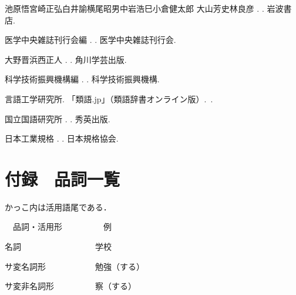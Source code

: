 \documentclass[japanese]{jnlp_1.4}
\begin{document}
\nocite{Book_01}
\nocite{Book_02}
\nocite{Book_03}
\nocite{Book_04}
\nocite{Book_05}
\nocite{Book_06}
\nocite{Web_07}

\begin{thebibliography}{}

池原悟\JBA 宮崎正弘\JBA 白井諭\JBA 横尾昭男\JBA 中岩浩巳\JBA 小倉健太郎\JBA
  大山芳史\JBA 林良彦 \BBCP.
\newblock {}.
\newblock 岩波書店.

医学中央雑誌刊行会編 \BBCP.
\newblock {}.
\newblock 医学中央雑誌刊行会.

大野晋\JBA 浜西正人 \BBCP.
\newblock {}.
\newblock 角川学芸出版.

科学技術振興機構編 \BBCP.
\newblock {}.
\newblock 科学技術振興機構.

言語工学研究所.
\newblock 「類語.jp」（類語辞書オンライン版）\inhibitglue.\
\newblock {}.

国立国語研究所 \BBCP.
\newblock {}.
\newblock 秀英出版.

日本工業規格 \BBCP.
\newblock {}.
\newblock 日本規格協会.

\end{thebibliography}

\appendix

\section{付録　品詞一覧}

 かっこ内は活用語尾である．

　品詞・活用形　　　　　例

名詞　　　　　　　　　学校

サ変名詞形　　　　　　勉強（する）

サ変非名詞形　　　　　察（する）
\end{document}
